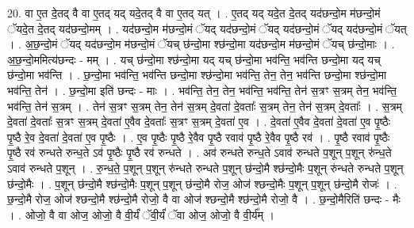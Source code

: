 \documentclass[17pt]{extarticle}
\begin{document}
20. वा ए॒त दे॒तद् वै वा ए॒तद् यद् यदे॒तद् वै वा ए॒तद् यत् । . ए॒तद् यद् यदे॒त दे॒तद् यद॑छन्दो॒म म॑छन्दो॒मं ॅयदे॒त दे॒तद् यद॑छन्दो॒मम् । . यद॑छन्दो॒म म॑छन्दो॒मं ॅयद् यद॑छन्दो॒मं ॅयद् यद॑छन्दो॒मं ॅयद् यद॑छन्दो॒मं ॅयत् । . अ॒छ॒न्दो॒मं ॅयद् यद॑छन्दो॒म म॑छन्दो॒मं ॅयच् छ॑न्दो॒मा श्छ॑न्दो॒मा यद॑छन्दो॒म म॑छन्दो॒मं ॅयच् छ॑न्दो॒माः । . अ॒छ॒न्दो॒ममित्य॑छन्दः - मम् । . यच् छ॑न्दो॒मा श्छ॑न्दो॒मा यद् यच् छ॑न्दो॒मा भव॑न्ति॒ भव॑न्ति छन्दो॒मा यद् यच् छ॑न्दो॒मा भव॑न्ति । . छ॒न्दो॒मा भव॑न्ति॒ भव॑न्ति छन्दो॒मा श्छ॑न्दो॒मा भव॑न्ति॒ तेन॒ तेन॒ भव॑न्ति छन्दो॒मा श्छ॑न्दो॒मा भव॑न्ति॒ तेन॑ । . छ॒न्दो॒मा इति॑ छन्दः - माः । . भव॑न्ति॒ तेन॒ तेन॒ भव॑न्ति॒ भव॑न्ति॒ तेन॑ स॒त्रꣳ स॒त्रम् तेन॒ भव॑न्ति॒ भव॑न्ति॒ तेन॑ स॒त्रम् । . तेन॑ स॒त्रꣳ स॒त्रम् तेन॒ तेन॑ स॒त्रम् दे॒वता॑ दे॒वताः᳚ स॒त्रम् तेन॒ तेन॑ स॒त्रम् दे॒वताः᳚ । . स॒त्रम् दे॒वता॑ दे॒वताः᳚ स॒त्रꣳ स॒त्रम् दे॒वता॑ ए॒वैव दे॒वताः᳚ स॒त्रꣳ स॒त्रम् दे॒वता॑ ए॒व । . दे॒वता॑ ए॒वैव दे॒वता॑ दे॒वता॑ ए॒व पृ॒ष्ठैः पृ॒ष्ठै रे॒व दे॒वता॑ दे॒वता॑ ए॒व पृ॒ष्ठैः । . ए॒व पृ॒ष्ठैः पृ॒ष्ठै रे॒वैव पृ॒ष्ठै रवाव॑ पृ॒ष्ठै रे॒वैव पृ॒ष्ठै रव॑ । . पृ॒ष्ठै रवाव॑ पृ॒ष्ठैः पृ॒ष्ठै रव॑ रुन्धते रुन्ध॒ते ऽव॑ पृ॒ष्ठैः पृ॒ष्ठै रव॑ रुन्धते । . अव॑ रुन्धते रुन्ध॒ते ऽवाव॑ रुन्धते प॒शून् प॒शून् रु॑न्ध॒ते ऽवाव॑ रुन्धते प॒शून् । . रु॒न्ध॒ते॒ प॒शून् प॒शून् रु॑न्धते रुन्धते प॒शून् छ॑न्दो॒मै श्छ॑न्दो॒मैः प॒शून् रु॑न्धते रुन्धते प॒शून् छ॑न्दो॒मैः । . प॒शून् छ॑न्दो॒मै श्छ॑न्दो॒मैः प॒शून् प॒शून् छ॑न्दो॒मै रोज॒ ओज॑ श्छन्दो॒मैः प॒शून् प॒शून् छ॑न्दो॒मै रोजः॑ । . छ॒न्दो॒मै रोज॒ ओज॑ श्छन्दो॒मै श्छ॑न्दो॒मै रोजो॒ वै वा ओज॑ श्छन्दो॒मै श्छ॑न्दो॒मै रोजो॒ वै । . छ॒न्दो॒मैरिति॑ छन्दः - मैः । . ओजो॒ वै वा ओज॒ ओजो॒ वै वी॒र्यं॑ ॅवी॒र्यं॑ ॅवा ओज॒ ओजो॒ वै वी॒र्य᳚म् । \newline
\end{document}
